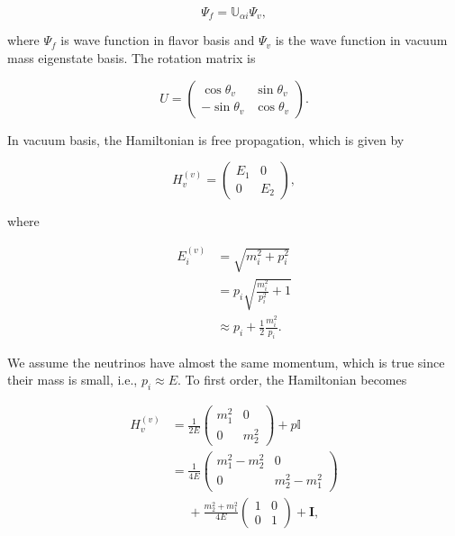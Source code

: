 \begin{equation}
\Psi_f = \mathbb{U}_{\alpha i}\Psi_{v},
\end{equation}

where $\Psi_f$ is wave function in flavor basis and $\Psi_v$ is the wave function in vacuum mass eigenstate basis. The rotation matrix is

\begin{equation}
U = \begin{pmatrix} \cos\theta_v & \sin \theta_v \\ -\sin \theta_v & \cos \theta_v \end{pmatrix}.
\end{equation}

In vacuum basis, the Hamiltonian is free propagation, which is given by

\begin{equation}
H_v^{(v)} = \begin{pmatrix} E_1 & 0 \\
0 & E_2
\end{pmatrix},
\end{equation}

where

\begin{align}
E_i^{(v)} & = \sqrt{m_i^2 + p_i^2 } \\
& = p_i \sqrt{\frac{m_i^2}{p_i^2} + 1} \\
& \approx p_i + \frac{1}{2} \frac{m_i^2}{p_i}.
\end{align}

We assume the neutrinos have almost the same momentum, which is true since their mass is small, i.e., $p_i \approx E$. To first order, the Hamiltonian becomes

\begin{align*}
H_v^{(v)} &= \frac{1}{2E} \begin{pmatrix}
m_1^2 & 0 \\
0 & m_2^2
\end{pmatrix} + p \mathbb{I}\\
& =  \frac{1}{4E} \begin{pmatrix}
m_1^2 - m_2^2 & 0 \\
0 & m_2^2 - m_1^2
\end{pmatrix} \\
&\phantom{=}+ \frac{m_2^2 + m_1^2}{4E} \begin{pmatrix}
1 & 0 \\
0 & 1
\end{pmatrix} + \mathbf{I},
\end{align*}

